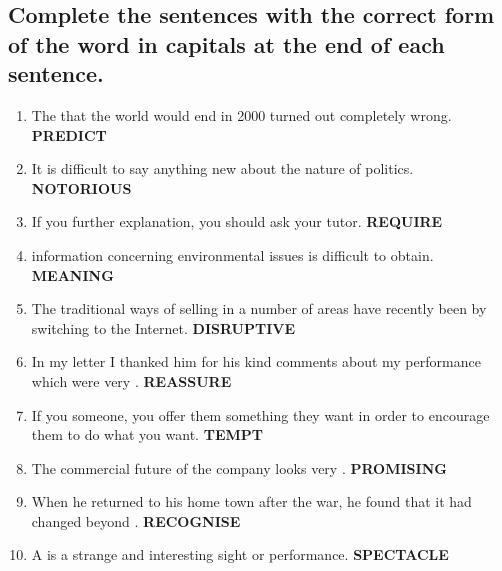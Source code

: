 \subsection*{Complete the sentences with the correct form of the word in capitals at the end of each
sentence.}
\begin{enumerate}
      \item The \underline{\hspace{2cm}} that the world would end in 2000 turned out completely wrong. \textbf{PREDICT}
      \item It is \underline{\hspace{2cm}} difficult to say anything new about the nature of politics. \textbf{NOTORIOUS}
      \item If you \underline{\hspace{2cm}} further explanation, you should ask your tutor. \textbf{REQUIRE}
      \item \underline{\hspace{2cm}} information concerning environmental issues is difficult to obtain. \textbf{MEANING}
      \item The traditional ways of selling in a number of areas have recently been \underline{\hspace{2cm}} by switching to the Internet. \textbf{DISRUPTIVE}
      \item In my letter I thanked him for his kind comments about my performance which were very \underline{\hspace{2cm}}. \textbf{REASSURE}
      \item If you \underline{\hspace{2cm}} someone, you offer them something they want in order to encourage them to do what you want. \textbf{TEMPT}
      \item The commercial future of the company looks very \underline{\hspace{2cm}}. \textbf{PROMISING}
      \item When he returned to his home town after the war, he found that it had changed beyond \underline{\hspace{2cm}}. \textbf{RECOGNISE}
      \item A \underline{\hspace{2cm}} is a strange and interesting sight or performance. \textbf{SPECTACLE}
\end{enumerate}


